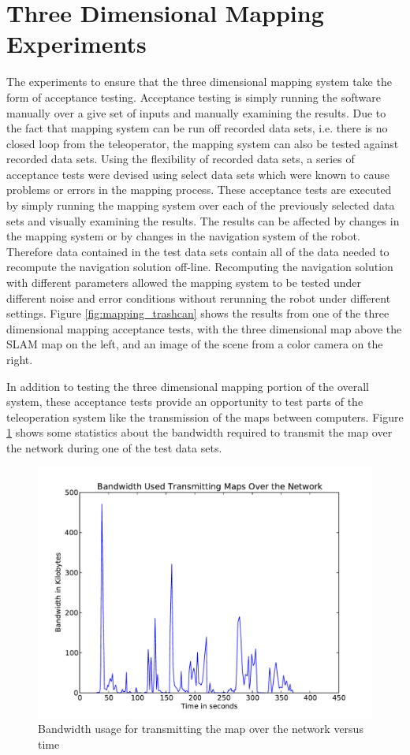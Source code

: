 \documentclass[12pt]{report}
\begin{document}
\section{Three Dimensional Mapping Experiments}
The experiments to ensure that the three dimensional mapping system take the form of acceptance testing.  Acceptance testing is simply running the software manually over a give set of inputs and manually examining the results.  Due to the fact that mapping system can be run off recorded data sets, i.e. there is no closed loop from the teleoperator, the mapping system can also be tested against recorded data sets.  Using the flexibility of recorded data sets, a series of acceptance tests were devised using select data sets which were known to cause problems or errors in the mapping process.  These acceptance tests are executed by simply running the mapping system over each of the previously selected data sets and visually examining the results.  The results can be affected by changes in the mapping system or by changes in the navigation system of the robot.  Therefore data contained in the test data sets contain all of the data needed to recompute the navigation solution off-line.  Recomputing the navigation solution with different parameters allowed the mapping system to be tested under different noise and error conditions without rerunning the robot under different settings.  Figure \ref{fig:mapping_trashcan} shows the results from one of the three dimensional mapping acceptance tests, with the three dimensional map above the SLAM map on the left, and an image of the scene from a color camera on the right.

In addition to testing the three dimensional mapping portion of the overall system, these acceptance tests provide an opportunity to test parts of the teleoperation system like the transmission of the maps between computers.  Figure \ref{fig:map_bandwidth} shows some statistics about the bandwidth required to transmit the map over the network during one of the test data sets.

\begin{figure}[ht]
  \centering
  \includegraphics[width=6.5in,keepaspectratio]{map_bandwidth.pdf}
  \caption{Bandwidth usage for transmitting the map over the network versus time}
  \label{fig:map_bandwidth}
\end{figure}
\end{document}
